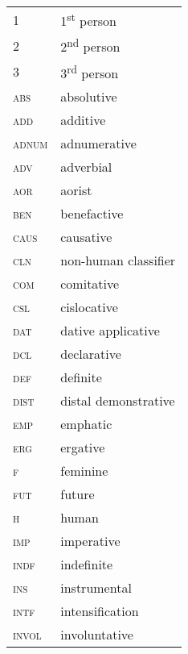 \documentclass[output=paper]{langscibook}
\begin{document}
\begin{tabularx}{.45\textwidth}{lQ}
\textsc{1} & 1\textsuperscript{st} person\\
\textsc{2} & 2\textsuperscript{nd} person\\
\textsc{3} & 3\textsuperscript{rd} person\\
\textsc{abs} & absolutive\\
\textsc{add} & additive\\
\textsc{adnum} & adnumerative\\
\textsc{adv} & adverbial\\
\textsc{aor} & aorist\\
\textsc{ben} & benefactive\\
\textsc{caus} & causative\\
\textsc{cln} & non-human classifier\\
\textsc{com} & comitative\\
\textsc{csl} & cislocative\\
\textsc{dat} & dative applicative\\
\textsc{dcl} & declarative\\
\textsc{def} & definite\\
\textsc{dist} & distal demonstrative\\
\textsc{emp} & emphatic\\
\textsc{erg} & ergative\\
\textsc{f} & feminine\\
\textsc{fut} & future\\
\textsc{h} & human\\
\textsc{imp} & imperative\\
\textsc{indf} & indefinite\\
\textsc{ins} & instrumental\\
\textsc{intf} & intensification\\
\textsc{invol} & involuntative\\
\end{tabularx}
\end{document}
